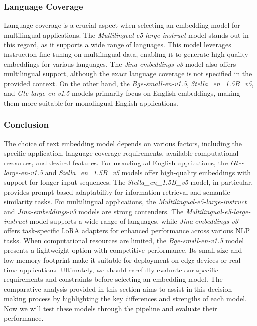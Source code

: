 \subsubsection{Language Coverage}
Language coverage is a crucial aspect when selecting an embedding model for multilingual applications. The \textit{Multilingual-e5-large-instruct} model stands out in this regard, as it supports a wide range of languages.
This model leverages instruction fine-tuning on multilingual data, enabling it to generate high-quality embeddings for various languages.
The \textit{Jina-embeddings-v3} model also offers multilingual support, although the exact language coverage is not specified in the provided context. On the other hand, the \textit{Bge-small-en-v1.5}, \textit{Stella\_en\_1.5B\_v5}, and \textit{Gte-large-en-v1.5} models primarily focus on English embeddings, making them more suitable for monolingual English applications.
\subsubsection{Conclusion}
The choice of text embedding model depends on various factors, including the specific application, language coverage requirements, available computational resources, and desired features. For monolingual English applications, the \textit{Gte-large-en-v1.5} and \textit{Stella\_en\_1.5B\_v5} models offer high-quality embeddings with support for longer input sequences.
The \textit{Stella\_en\_1.5B\_v5} model, in particular, provides prompt-based adaptability for information retrieval and semantic similarity tasks.
For multilingual applications, the \textit{Multilingual-e5-large-instruct} and \textit{Jina-embeddings-v3} models are strong contenders.
The \textit{Multilingual-e5-large-instruct} model supports a wide range of languages, while \textit{Jina-embeddings-v3} offers task-specific LoRA adapters for enhanced performance across various NLP tasks.
When computational resources are limited, the \textit{Bge-small-en-v1.5} model presents a lightweight option with competitive performance.
Its small size and low memory footprint make it suitable for deployment on edge devices or real-time applications.
Ultimately, we should carefully evaluate our specific requirements and constraints before selecting an embedding model.
The comparative analysis provided in this section aims to assist in this decision-making process by highlighting the key differences and strengths of each model.
Now we will test these models through the pipeline and evaluate their performance.

